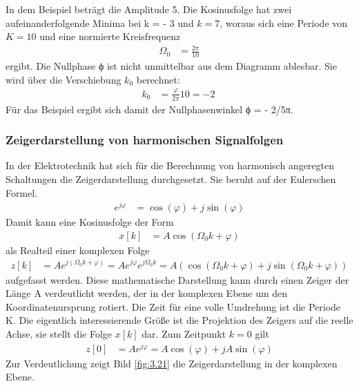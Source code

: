 In dem Beispiel beträgt die Amplitude 5. Die Kosinusfolge hat zwei aufeinanderfolgende Minima bei k = - 3 und \(k = 7\), woraus sich eine Periode von \(K = 10\) und eine normierte Kreisfrequenz
\begin{align}
\Omega_{0} &= \frac{2  \pi}{10} \label{eq:3.53}
\end{align}
ergibt. Die Nullphase ϕ ist nicht unmittelbar aus dem Diagramm ablesbar. Sie wird über die Verschiebung \(k_{0}\) berechnet:
\begin{align}
k_{0} &= \frac{\varphi}{2  \pi}  10 = - 2\ \label{eq:3.54}
\end{align}
Für das Beispiel ergibt sich damit der Nullphasenwinkel ϕ = - 2/5π.

\subsubsection{Zeigerdarstellung von harmonischen Signalfolgen}\label{sec:zeigerdarstellung-von-harmonischen-signalfolgen}

In der Elektrotechnik hat sich für die Berechnung von harmonisch angeregten Schaltungen die Zeigerdarstellung durchgesetzt. Sie beruht auf der Eulerschen Formel.
\begin{align}
e^{j  \varphi} &= \cos(\varphi) + j  \sin(\varphi) \label{eq:3.55}
\end{align}
Damit kann eine Kosinusfolge der Form
\begin{align}
x[ k] &= A  \cos\left( \Omega_{0}  k + \varphi \right) \label{eq:3.56}
\end{align}
als Realteil einer komplexen Folge
\begin{align}
z[ k] &= A  e^{j  \left( \Omega_{0}  k + \varphi \right)} = A  e^{j  \varphi}  e^{j  \Omega_{0}  k} = A  \left( \cos\left( \Omega_{0}  k + \varphi \right) + j  \sin\left( \Omega_{0}  k + \varphi \right) \right) \label{eq:3.57}
\end{align}
aufgefasst werden. Diese mathematische Darstellung kann durch einen Zeiger der Länge A verdeutlicht werden, der in der komplexen Ebene um den Koordinatenursprung rotiert. Die Zeit für eine volle Umdrehung ist die Periode K. Die eigentlich interessierende Größe ist die Projektion des Zeigers auf die reelle Achse, sie stellt die Folge \(x[k]\) dar. Zum Zeitpunkt \(k = 0\) gilt
\begin{align}
z[ 0] &= A  e^{j  \varphi} = A  \cos(\varphi) + j  A  \sin(\varphi) \label{eq:3.58}
\end{align}
Zur Verdeutlichung zeigt Bild \ref{fig:3.21} die Zeigerdarstellung in der komplexen Ebene.

